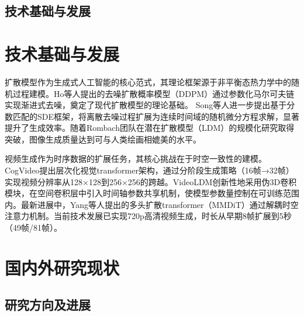 \subsection{技术基础与发展}
\section{技术基础与发展}
扩散模型作为生成式人工智能的核心范式，其理论框架源于非平衡态热力学中的随机过程建模。Ho等人\cite{ho2020denoising}提出的去噪扩散概率模型（DDPM）通过参数化马尔可夫链实现渐进式去噪，奠定了现代扩散模型的理论基础。
Song等人\cite{song2020denoising}进一步提出基于分数匹配的SDE框架，将离散去噪过程扩展为连续时间域的随机微分方程求解，显著提升了生成效率。随着Rombach团队\cite{blattmann2023align}在潜在扩散模型（LDM）的规模化研究取得突破，图像生成质量达到可与人类绘画相媲美的水平。

视频生成作为时序数据的扩展任务，其核心挑战在于时空一致性的建模。CogVideo\cite{hong2022cogvideo}提出层次化视觉transformer架构，通过分阶段生成策略（16帧→32帧）实现视频分辨率从128×128到256×256的跨越。VideoLDM\cite{blattmann2023align}创新性地采用伪3D卷积模块，在空间卷积层中引入时间轴参数共享机制，使模型参数量控制在可训练范围内。最新进展中，Yang等人\cite{yang2024cogvideox}提出的多头扩散transformer（MMDiT）通过解耦时空注意力机制。当前技术发展已实现720p高清视频生成，时长从早期8帧扩展到5秒（49帧/81帧）。
\section{国内外研究现状}

\subsection{研究方向及进展}

